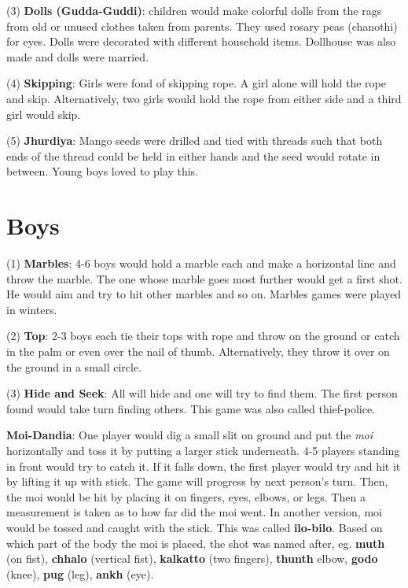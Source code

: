 (3) \textbf{Dolls (Gudda-Guddi)}: children would make colorful dolls from the
rags from old or unused clothes taken from parents. They used rosary peas
(chanothi) for eyes. Dolls were decorated with different household items.
Dollhouse was also made and dolls were married. 

(4) \textbf{Skipping}: Girls were fond of skipping rope. A girl alone will hold
the rope and skip. Alternatively, two girls would hold the rope from either side
and a third girl would skip. 

(5) \textbf{Jhurdiya}: Mango seeds were drilled and tied with threads such that
both ends of the thread could be held in either hands and the seed would rotate
in between. Young boys loved to play this.

\section{Boys}

(1) \textbf{Marbles}: 4-6 boys would hold a marble each and make a horizontal
line and throw the marble. The one whose marble goes most further would get a
first shot. He would aim and try to hit other marbles and so on. Marbles games
were played in winters.

(2) \textbf{Top}: 2-3 boys each tie their tops with rope and throw on the
ground or catch in the palm or even over the nail of thumb. Alternatively, they
throw it over on the ground in a small circle.

(3) \textbf{Hide and Seek}: All will hide and one will try to find them. The
first person found would take turn finding others. This game was also called
thief-police.

\textbf{Moi-Dandia}: One player would dig a small slit on ground and put the
\textit{moi} horizontally and toss it by putting a larger stick underneath. 4-5
players standing in front would try to catch it. If it falls down, the first
player would try and hit it by lifting it up with stick. The game will progress
by next person's turn. Then, the moi would be hit by placing it on fingers,
eyes, elbows, or legs. Then a measurement is taken as to how far did the moi
went. In another version, moi would be tossed and caught with the stick. This
was called \textbf{ilo-bilo}. Based on which part of the body the moi is
placed, the shot was named after, eg. \textbf{muth} (on fist), \textbf{chhalo}
(vertical fist), \textbf{kalkatto} (two fingers), \textbf{thunth} {elbow},
\textbf{godo} (knee), \textbf{pug} (leg), \textbf{ankh} (eye).

